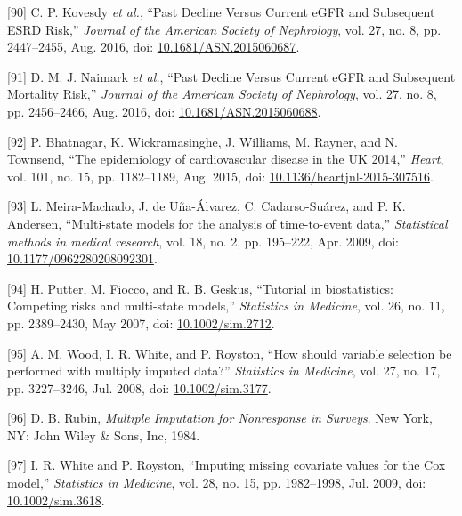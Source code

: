 \documentclass[12pt,PhD,twoside,openright]{muthesis}
\newenvironment{cslreferences}%
  {}%
  {\par}
\begin{document}
\begin{cslreferences}
\leavevmode\hypertarget{ref-kovesdy_past_2016}{}%
{[}90{]} C. P. Kovesdy \emph{et al.}, ``Past Decline Versus Current eGFR and Subsequent ESRD Risk,'' \emph{Journal of the American Society of Nephrology}, vol. 27, no. 8, pp. 2447--2455, Aug. 2016, doi: \href{https://doi.org/10.1681/ASN.2015060687}{10.1681/ASN.2015060687}.

\leavevmode\hypertarget{ref-naimark_past_2016}{}%
{[}91{]} D. M. J. Naimark \emph{et al.}, ``Past Decline Versus Current eGFR and Subsequent Mortality Risk,'' \emph{Journal of the American Society of Nephrology}, vol. 27, no. 8, pp. 2456--2466, Aug. 2016, doi: \href{https://doi.org/10.1681/ASN.2015060688}{10.1681/ASN.2015060688}.

\leavevmode\hypertarget{ref-bhatnagar_epidemiology_2015}{}%
{[}92{]} P. Bhatnagar, K. Wickramasinghe, J. Williams, M. Rayner, and N. Townsend, ``The epidemiology of cardiovascular disease in the UK 2014,'' \emph{Heart}, vol. 101, no. 15, pp. 1182--1189, Aug. 2015, doi: \href{https://doi.org/10.1136/heartjnl-2015-307516}{10.1136/heartjnl-2015-307516}.

\leavevmode\hypertarget{ref-meira-machado_multi-state_2009}{}%
{[}93{]} L. Meira-Machado, J. de Uña-Álvarez, C. Cadarso-Suárez, and P. K. Andersen, ``Multi-state models for the analysis of time-to-event data,'' \emph{Statistical methods in medical research}, vol. 18, no. 2, pp. 195--222, Apr. 2009, doi: \href{https://doi.org/10.1177/0962280208092301}{10.1177/0962280208092301}.

\leavevmode\hypertarget{ref-putter_tutorial_2007}{}%
{[}94{]} H. Putter, M. Fiocco, and R. B. Geskus, ``Tutorial in biostatistics: Competing risks and multi-state models,'' \emph{Statistics in Medicine}, vol. 26, no. 11, pp. 2389--2430, May 2007, doi: \href{https://doi.org/10.1002/sim.2712}{10.1002/sim.2712}.

\leavevmode\hypertarget{ref-wood_how_2008}{}%
{[}95{]} A. M. Wood, I. R. White, and P. Royston, ``How should variable selection be performed with multiply imputed data?'' \emph{Statistics in Medicine}, vol. 27, no. 17, pp. 3227--3246, Jul. 2008, doi: \href{https://doi.org/10.1002/sim.3177}{10.1002/sim.3177}.

\leavevmode\hypertarget{ref-rubin_multiple_1984}{}%
{[}96{]} D. B. Rubin, \emph{Multiple Imputation for Nonresponse in Surveys}. New York, NY: John Wiley \& Sons, Inc, 1984.

\leavevmode\hypertarget{ref-white_imputing_2009}{}%
{[}97{]} I. R. White and P. Royston, ``Imputing missing covariate values for the Cox model,'' \emph{Statistics in Medicine}, vol. 28, no. 15, pp. 1982--1998, Jul. 2009, doi: \href{https://doi.org/10.1002/sim.3618}{10.1002/sim.3618}.


\end{cslreferences}
\end{document}
